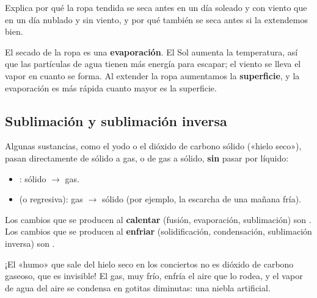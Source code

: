 \begin{exercise}
    Explica por qué la ropa tendida se seca antes en un día soleado y con viento que en un día nublado y sin viento, y por qué también se seca antes si la extendemos bien.
    \begin{solu}
        El secado de la ropa es una \textbf{evaporación}. El Sol aumenta la temperatura, así que las partículas de agua tienen más energía para escapar; el viento se lleva el vapor en cuanto se forma. Al extender la ropa aumentamos la \textbf{superficie}, y la evaporación es más rápida cuanto mayor es la superficie.
    \end{solu}
\end{exercise}

\subsection{Sublimación y sublimación inversa}

Algunas sustancias, como el yodo o el dióxido de carbono sólido («hielo seco»), pasan directamente de sólido a gas, o de gas a sólido, \textbf{sin} pasar por líquido:

\begin{itemize}
    \item {}: sólido \(\to\) gas.
    \item {} (o regresiva): gas \(\to\) sólido (por ejemplo, la escarcha de una mañana fría).
\end{itemize}

\begin{impt}
    Los cambios que se producen al \textbf{calentar} (fusión, evaporación, sublimación) son . Los cambios que se producen al \textbf{enfriar} (solidificación, condensación, sublimación inversa) son .
\end{impt}

\begin{didyouknow}
    ¡El «humo» que sale del hielo seco en los conciertos no es dióxido de carbono gaseoso, que es invisible! El gas, muy frío, enfría el aire que lo rodea, y el vapor de agua del aire se condensa en gotitas diminutas: una niebla artificial.
\end{didyouknow}

